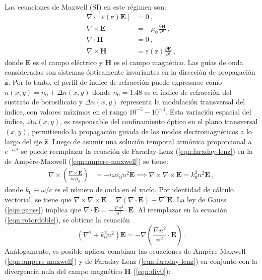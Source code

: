Las ecuaciones de Maxwell (SI) en este régimen son:
\begin{align}
	\nabla\cdot\left[\varepsilon(\textbf{r})\textbf{E}\right] &= 0 \ , \label{eqn:gauss}
	\\	
	\nabla\times\textbf{E} &= -\mu_0 \frac{\partial \textbf{H}}{\partial t} \ , \label{eqn:faraday-lenz}
	\\	
	\nabla\cdot\textbf{H} &= 0 \ , \label{eqn:div0}
	\\	
	\nabla\times\textbf{H} &=\varepsilon(\textbf{r}) \frac{\partial \textbf{E}}{\partial t} \ , \label{eqn:ampere-maxwell}
\end{align}
donde \textbf{E} es el campo eléctrico y \textbf{H} es el campo magnético. Las guías de onda consideradas son sistemas ópticamente invariantes en la dirección de propagación $\hat{\textbf{z}}$. Por lo tanto, el perfil de índice de refracción puede expresarse como $n(x,y) = n_0 + \Delta n(x,y)$ donde $n_0 = 1.48$ es el índice de refracción del sustrato de borosilicato y $\Delta n(x,y)$ representa la modulación transversal del índice, con valores máximos en el rango $10^{-5} - 10^{-3}$. Esta variación espacial del índice, $\Delta n(x,y)$, es responsable del confinamiento óptico en el plano transversal $(x,y)$, permitiendo la propagación guiada de los modos electromagnéticos a lo largo del eje $\hat{\textbf{z}}$. Luego de asumir una solución temporal armónica proporcional a $e^{-i\omega t}$ se puede reemplazar la ecuación de Faraday-Lenz (\ref{eqn:faraday-lenz}) en la de Ampère-Maxwell (\ref{eqn:ampere-maxwell}) se tiene:
\begin{align}
	\nabla\times\left(\frac{\nabla\times\textbf{E}}{i\omega\mu_0}\right) &= -i\omega \varepsilon_0 n^2 \textbf{E} \implies \nabla\times\nabla\times\textbf{E} = k_0^2n^2\textbf{E} \ , \label{eqn:rotordoble}
\end{align}
donde $k_0 \equiv \omega/c$ es el número de onda en el vacío. Por identidad de cálculo vectorial, se tiene que $\nabla\times\nabla\times\textbf{E} = \nabla(\nabla\cdot\textbf{E}) - \nabla^2\textbf{E}$. La ley de Gauss (\ref{eqn:gauss}) implica que $\nabla\cdot \textbf{E} = -\frac{\nabla n^2}{n^2}\cdot\textbf{E}$. Al reemplazar en la ecuación (\ref{eqn:rotordoble}), se obtiene la ecuación 
\begin{equation}
	\left(\nabla^2  + k_0^2n^2\right)\textbf{E} = -\nabla\left( \frac{\nabla n^2}{n^2} \cdot \textbf{E}  \right) \ . \label{eqn:helmholz}
\end{equation}
Análogamente, es posible aplicar combinar las ecuaciones de Ampère-Maxwell (\ref{eqn:ampere-maxwell}) y de Faraday-Lenz (\ref{eqn:faraday-lenz}) en conjunto con la divergencia nula del campo magnético \textbf{H} (\ref{eqn:div0}):
